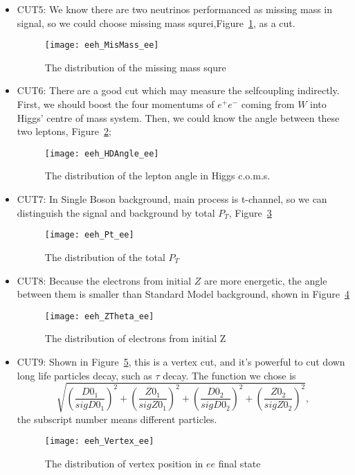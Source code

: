 \documentclass[11pt,a4paper]{cepcnote}
\begin{document}
\begin{itemize}
\item CUT5: We know there are two neutrinos performanced as missing mass in signal, 
so we could choose missing mass squrei,Figure~\ref{fig:MisMass2}, as a cut.\\
\begin{figure}[H]
\centering
\texttt{[image: eeh\_MisMass\_ee]}
\caption[Missing Mass Squre]{The distribution of the missing mass squre}
\label{fig:MisMass2}
\end{figure}

\item CUT6: There are a good cut which may measure the selfcoupling indirectly.
First, we should boost the four momentums of $e^+e^-$ coming from $W$ into Higgs' centre of mass system.
Then, we could know the angle between these two leptons, Figure~\ref{fig:HDAngle};
\begin{figure}[H]
\centering
\texttt{[image: eeh\_HDAngle\_ee]}
\caption[Angle in Higgs coms.]{The distribution of the lepton angle in Higgs c.o.m.s.}
\label{fig:HDAngle}
\end{figure}

\item CUT7: In Single Boson background, main process is t-channel, so we can distinguish the signal and background 
by total $P_{T}$, Figure~\ref{fig:TotalPt}
\begin{figure}[H]
\centering
\texttt{[image: eeh\_Pt\_ee]}
\caption[Total $P_{T}$]{The distribution of the total $P_{T}$}
\label{fig:TotalPt}
\end{figure}

\item CUT8: Because the electrons from initial $Z$ are more energetic, the angle between them is smaller than 
Standard Model background, shown in Figure~\ref{CosZ}
\begin{figure}[H]
\centering
\texttt{[image: eeh\_ZTheta\_ee]}
\caption[CosTheta of Z]{The distribution of electrons from initial Z}
\label{CosZ}
\end{figure}

\item  CUT9: Shown in Figure~\ref{fig:eed0z0}, this is a vertex cut, and it's powerful to cut down long life particles decay, 
 such as $\tau$ decay. The function we chose is
 \begin{equation*}
 \sqrt{(\frac{D0_1}{sigD0_1})^2+(\frac{Z0_1}{sigZ0_1})^2+(\frac{D0_2}{sigD0_2})^2+(\frac{Z0_2}{sigZ0_2})^2},
 \end{equation*}
 the subscript number means different particles. \\
\begin{figure}[H]
\centering
\texttt{[image: eeh\_Vertex\_ee]}
\caption[Vertex of ee channel]{The distribution of vertex position in $ee$ final state}
\label{fig:eed0z0}
\end{figure}


\end{itemize}
\end{document}
